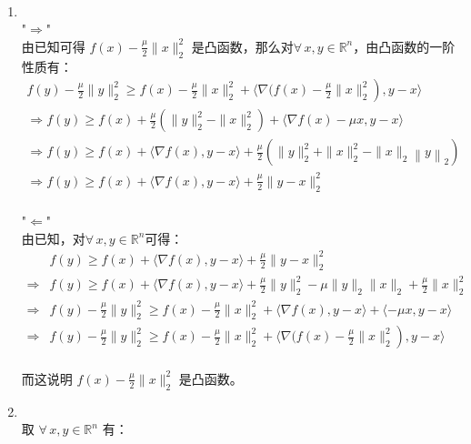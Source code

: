 \documentclass[11pt,letter,notitlepage]{article}
\begin{document}
\begin{solution}
    \heiti
    \ \\
    \begin{enumerate}
        \item \ \\
        "$\Rightarrow$"\\
        由已知可得 $f(x)-\frac{\mu}{2}\|x\|_{2}^{2}$ 是凸函数，那么对$ \forall\, x,y\in\mathbb{R}^n $，由凸函数的一阶性质有：\ \\
        $\begin{array}{l}{\left. f(y)-\frac{\mu}{2}\|y\|_{2}^{2} \geqslant f(x)-\frac{\mu}{2}\|x\|_{2}^{2}+\langle \nabla (f(x)-\frac{\mu}{2}\|x\|_{2}^{2}\right), y-x\rangle} \\ {\Rightarrow f(y) \geqslant f(x)+\frac{\mu}{2}\left(\|y\|_{2}^{2}-\|x\|_{2}^{2}\right)+\langle\nabla f(x)-\mu x, y-x\rangle} \\ {\Rightarrow f(y) \geqslant f(x)+\langle\nabla f(x), y-x\rangle+\frac{\mu}{2}\left(\|y\|_{2}^{2}+\|x\|_{2}^{2} - \|x\|_{2}\left\|y\right\|_{2}\right)} \\ {\Rightarrow f(y) \geqslant f(x)+\langle \nabla f(x), y-x \rangle+\frac{\mu}{2} \| y - x \|_{2}^{2}}\end{array}$\\ \ \\
        "$\Leftarrow$"\\
        由已知，对$ \forall\, x,y\in\mathbb{R}^n $可得：\\
        $\begin{aligned} & f(y) \geqslant f(x)+\langle\nabla f(x), y-x\rangle+\frac{\mu}{2}\|y-x\|_{2}^{2} \\ \Rightarrow & f(y) \geqslant f(x)+\langle\nabla f(x), y-x\rangle+\frac{\mu}{2}\|y\|_{2}^{2}-\mu\|y\|_{2}\|x\|_{2}+\frac{\mu}{2}\|x\|_{2}^{2} \\ \Rightarrow & f(y)-\frac{\mu}{2}\|y\|_{2}^{2} \geqslant f(x)-\frac{\mu}{2}\|x\|_{2}^{2}+\langle\nabla f(x), y-x\rangle+\langle{-\mu x} , y-x\rangle\\ \Rightarrow &\left.f(y)-\frac{\mu}{2}\|y\|_{2}^{2} \geqslant f(x)-\frac{\mu}{2}\|x\|_{2}^{2}+\langle\nabla (f(x)-\frac{\mu}{2}\|x\|_{2}^{2}\right), y-x\rangle\end{aligned}$\\ \ \\
        而这说明 $f(x)-\frac{\mu}{2}\|x\|_2^2$ 是凸函数。
        \item \ \\
        取 $\forall\, x,y\in\mathbb{R}^n$ 有：\\

\end{enumerate}
\end{solution}
\end{document}
